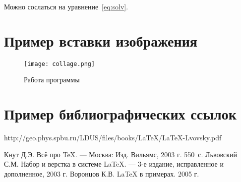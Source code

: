\documentclass[12pt,a4paper]{scrartcl}
\begin{document}
	Можно сослаться на уравнение~\eqref{eq:solv}.
	
\section{Пример вставки изображения}
\label{sec:picexample}
\begin{figure}[h]
	\centering
	\texttt{[image: collage.png]}
	\caption{Работа программы}\label{fig:par}
\end{figure}
	
	\section{Пример библиографических ссылок}
    http://geo.phys.spbu.ru/LDUS/files/books/LaTeX/LaTeX-Lvovsky.pdf
	
	\begin{thebibliography}{9}
		Кнут Д.Э. Всё про \TeX. \newblock --- Москва: Изд. Вильямс, 2003 г. 550~с.
		Львовский С.М. Набор и верстка в системе \LaTeX{}. \newblock --- 3-е издание, исправленное и дополненное, 2003 г.
		Воронцов К.В. \LaTeX{} в примерах. 2005 г.
	\end{thebibliography}
\end{document}

